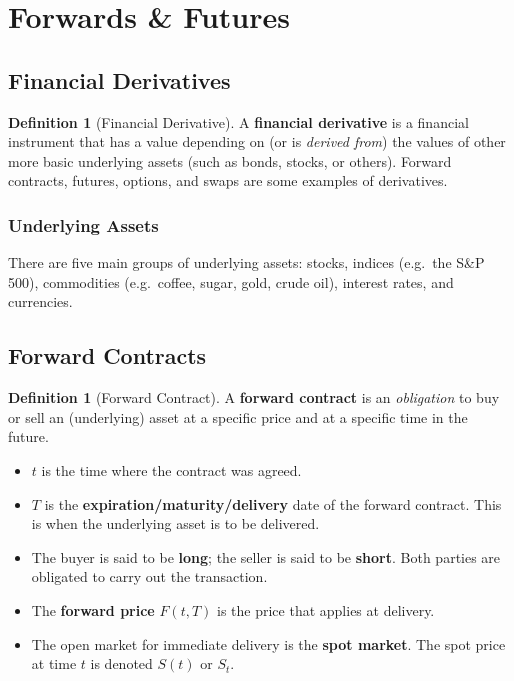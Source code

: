 \documentclass[12pt, a4paper]{article}
\theoremstyle{plain}
\theoremstyle{definition}
\newtheorem{definition}[theorem]{Definition}
\theoremstyle{remark}
\begin{document}
\pagebreak
\section{Forwards \& Futures}

\subsection{Financial Derivatives}

\begin{definition}[Financial Derivative]
  A \textbf{financial derivative} is a financial instrument that has a value depending on (or is \emph{derived from}) the values of other more basic underlying assets (such as bonds, stocks, or others). Forward contracts, futures, options, and swaps are some examples of derivatives.
\end{definition}

\subsubsection*{Underlying Assets}

There are five main groups of underlying assets: stocks, indices (e.g.\ the S\&P 500), commodities (e.g.\ coffee, sugar, gold, crude oil), interest rates, and currencies.

\subsection{Forward Contracts}

\begin{definition}[Forward Contract]
  A \textbf{forward contract} is an \emph{obligation} to buy or sell an (underlying) asset at a specific price and at a specific time in the future.
  \begin{itemize}
    \item $t$ is the time where the contract was agreed.
    \item $T$ is the \textbf{expiration/maturity/delivery} date of the forward contract. This is when the underlying asset is to be delivered.
    \item The buyer is said to be \textbf{long}; the seller is said to be \textbf{short}. Both parties are obligated to carry out the transaction.
    \item The \textbf{forward price} $F(t,T)$ is the price that applies at delivery.
    \item The open market for immediate delivery is the \textbf{spot market}. The spot price at time $t$ is denoted $S(t)$ or $S_t$.
  \end{itemize}
\end{definition}
\end{document}
